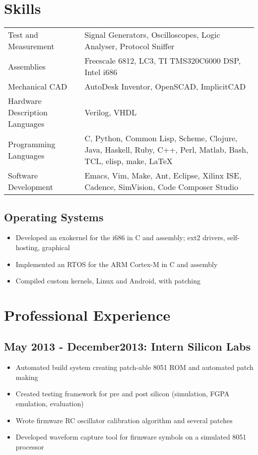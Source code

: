 \documentclass[letterpaper,12pt]{resume}
\begin{document}
\section{Skills}
\noindent
\begin{tabular}{p{}p{}}
  Test and Measurement&
  Signal Generators, Oscilloscopes, Logic Analyser, Protocol Sniffer\\
  \noalign{\smallskip}
  Assemblies&
  Freescale 6812, LC3, TI TMS320C6000 DSP, Intel i686\\
  \noalign{\smallskip}
  Mechanical CAD&
  AutoDesk Inventor, OpenSCAD, ImplicitCAD\\
  \noalign{\smallskip}
  Hardware Description Languages&
  Verilog, VHDL\\
  \noalign{\smallskip}
  Programming Languages&
  C, Python, Common Lisp, Scheme, Clojure, Java, Haskell, Ruby, C++, Perl, Matlab, Bash, TCL, elisp, make, \LaTeX\ \\
  \noalign{\smallskip}
  Software Development&
  Emacs, Vim, Make, Ant, Eclipse, Xilinx ISE, Cadence, SimVision, Code Composer Studio\\
\end{tabular}

\subsection{Operating Systems}
\begin{itemize}
  \item
    Developed an exokernel for the i686 in C and assembly; ext2 drivers, self-hosting, graphical
  \item
    Implemented an RTOS for the ARM Cortex-M in C and assembly
  \item
    Compiled custom kernels, Linux and Android, with patching
\end{itemize}

\smallskip
\smallskip
\section{Professional Experience}
\subsection{May 2013 - December2013: Intern Silicon Labs}
\begin{itemize}
  \item
    Automated build system creating patch-able 8051 ROM and automated patch making
  \item
    Created testing framework for pre and post silicon (simulation, FGPA emulation, evaluation)
  \item
    Wrote firmware RC oscillator calibration algorithm and several patches
  \item
    Developed waveform capture tool for firmware symbols on a simulated 8051 processor
\end{itemize}
\end{document}
